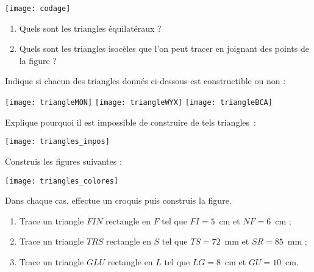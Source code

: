 \begin{exercice}
\begin{center} \texttt{[image: codage]} \end{center}
\begin{enumerate}
 \item Quels sont les triangles équilatéraux ?
 \item Quels sont les triangles isocèles que l'on peut tracer en joignant des points de la figure ?
 \end{enumerate}
\end{exercice}


\vspace{2em}

\begin{exercice}
Indique si chacun des triangles donnés ci-dessous est constructible ou non :

\texttt{[image: triangleMON]} \hfill \texttt{[image: triangleWYX]} \hfill \texttt{[image: triangleBCA]}
\end{exercice}


\begin{exercice}
Explique pourquoi il est impossible de construire de tels triangles :

\hfill \texttt{[image: triangles\_impos]} \hfill 
\end{exercice}


\begin{exercice}
Construis les figures suivantes :

\hfill \texttt{[image: triangles\_colores]} \hfill 
\end{exercice}


\begin{exercice}
Dans chaque cas, effectue un croquis puis construis la figure.

 \begin{enumerate}
  \item Trace un triangle $FIN$ rectangle en $F$ tel que $FI = 5$ cm et $NF = 6$ cm ;
  \item Trace un triangle $TRS$ rectangle en $S$ tel que $TS = 72$ mm et $SR = 85$ mm ;
  \item Trace un triangle $GLU$ rectangle en $L$ tel que $LG = 8$ cm et $GU = 10$ cm.
  \end{enumerate}
\end{exercice}


